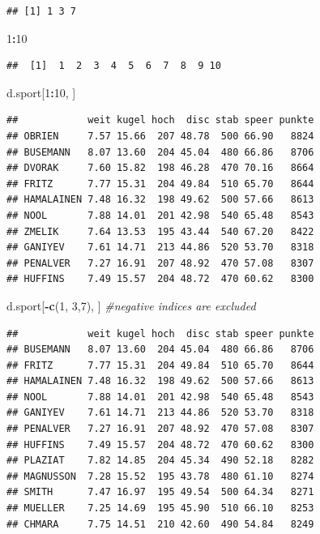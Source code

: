 \documentclass[
]{article}
\newenvironment{Shaded}{\begin{snugshade}}{\end{snugshade}}
\newcommand{\CommentTok}[1]{\textcolor[rgb]{0.56,0.35,0.01}{\textit{#1}}}
\newcommand{\DecValTok}[1]{\textcolor[rgb]{0.00,0.00,0.81}{#1}}
\newcommand{\FunctionTok}[1]{\textcolor[rgb]{0.13,0.29,0.53}{\textbf{#1}}}
\newcommand{\NormalTok}[1]{#1}
\newcommand{\SpecialCharTok}[1]{\textcolor[rgb]{0.81,0.36,0.00}{\textbf{#1}}}
\begin{document}
\begin{verbatim}
## [1] 1 3 7
\end{verbatim}

\begin{Shaded}
\begin{Highlighting}[]
\DecValTok{1}\SpecialCharTok{:}\DecValTok{10}
\end{Highlighting}
\end{Shaded}

\begin{verbatim}
##  [1]  1  2  3  4  5  6  7  8  9 10
\end{verbatim}

\begin{Shaded}
\begin{Highlighting}[]
\NormalTok{d.sport[}\DecValTok{1}\SpecialCharTok{:}\DecValTok{10}\NormalTok{, ]}
\end{Highlighting}
\end{Shaded}

\begin{verbatim}
##            weit kugel hoch  disc stab speer punkte
## OBRIEN     7.57 15.66  207 48.78  500 66.90   8824
## BUSEMANN   8.07 13.60  204 45.04  480 66.86   8706
## DVORAK     7.60 15.82  198 46.28  470 70.16   8664
## FRITZ      7.77 15.31  204 49.84  510 65.70   8644
## HAMALAINEN 7.48 16.32  198 49.62  500 57.66   8613
## NOOL       7.88 14.01  201 42.98  540 65.48   8543
## ZMELIK     7.64 13.53  195 43.44  540 67.20   8422
## GANIYEV    7.61 14.71  213 44.86  520 53.70   8318
## PENALVER   7.27 16.91  207 48.92  470 57.08   8307
## HUFFINS    7.49 15.57  204 48.72  470 60.62   8300
\end{verbatim}

\begin{Shaded}
\begin{Highlighting}[]
\NormalTok{d.sport[}\SpecialCharTok{{-}}\FunctionTok{c}\NormalTok{(}\DecValTok{1}\NormalTok{, }\DecValTok{3}\NormalTok{,}\DecValTok{7}\NormalTok{), ] }\CommentTok{\#negative indices are excluded}
\end{Highlighting}
\end{Shaded}

\begin{verbatim}
##            weit kugel hoch  disc stab speer punkte
## BUSEMANN   8.07 13.60  204 45.04  480 66.86   8706
## FRITZ      7.77 15.31  204 49.84  510 65.70   8644
## HAMALAINEN 7.48 16.32  198 49.62  500 57.66   8613
## NOOL       7.88 14.01  201 42.98  540 65.48   8543
## GANIYEV    7.61 14.71  213 44.86  520 53.70   8318
## PENALVER   7.27 16.91  207 48.92  470 57.08   8307
## HUFFINS    7.49 15.57  204 48.72  470 60.62   8300
## PLAZIAT    7.82 14.85  204 45.34  490 52.18   8282
## MAGNUSSON  7.28 15.52  195 43.78  480 61.10   8274
## SMITH      7.47 16.97  195 49.54  500 64.34   8271
## MUELLER    7.25 14.69  195 45.90  510 66.10   8253
## CHMARA     7.75 14.51  210 42.60  490 54.84   8249
\end{verbatim}
\end{document}
